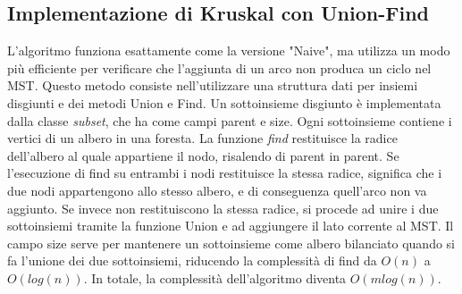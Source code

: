 \subsection{Implementazione di Kruskal con Union-Find}
L'algoritmo funziona esattamente come la versione "Naive", ma utilizza un modo più efficiente per verificare
che l'aggiunta di un arco non produca un ciclo nel MST. Questo metodo consiste nell'utilizzare una struttura dati per insiemi disgiunti e dei metodi Union e Find. Un sottoinsieme disgiunto è implementata dalla classe \textit{subset}, che
ha come campi parent e size. Ogni sottoinsieme contiene i vertici di un albero in una foresta. La funzione \textit{find} restituisce la radice dell'albero al quale appartiene il nodo, risalendo di parent in parent. Se l'esecuzione di find su entrambi i nodi restituisce la stessa radice,
significa che i due nodi appartengono  allo stesso albero, e di conseguenza quell'arco non va aggiunto. Se invece non restituiscono la stessa radice, si procede ad unire i due sottoinsiemi tramite la funzione Union
e ad aggiungere il lato corrente al MST. Il campo size serve per mantenere un sottoinsieme come albero bilanciato quando si fa l'unione dei due sottoinsiemi, riducendo la complessità di find da $O(n)$ a $O(log(n))$. In totale, la complessità dell'algoritmo diventa $O(m log(n))$.